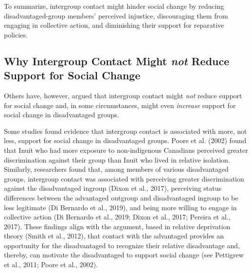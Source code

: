 \documentclass[12pt, letterpaper]{article}
\begin{document}
To summarize, intergroup contact might hinder social change by reducing
disadvantaged-group members' perceived injustice, discouraging them from
engaging in collective action, and diminishing their support for
reparative policies.

\hypertarget{why-intergroup-contact-might-not-reduce-support-for-social-change}{%
\subsection{\texorpdfstring{Why Intergroup Contact Might \emph{not}
Reduce Support for Social
Change}{Why Intergroup Contact Might not Reduce Support for Social Change}}\label{why-intergroup-contact-might-not-reduce-support-for-social-change}}

Others have, however, argued that intergroup contact might \emph{not}
reduce support for social change and, in some circumstances, might even
\emph{increase} support for social change in disadvantaged groups.

Some studies found evidence that intergroup contact is associated with
more, not less, support for social change in disadvantaged groups. Poore
et al. (2002) found that Inuit who had more exposure to non-indigenous
Canadians perceived greater discrimination against their group than
Inuit who lived in relative isolation. Similarly, researchers found
that, among members of various disadvantaged groups, intergroup contact
was associated with perceiving greater discrimination against the
disadvantaged ingroup (Dixon et al., 2017), perceiving status
differences between the advantaged outgroup and disadvantaged ingroup to
be less legitimate (Di Bernardo et al., 2019), and being more willing to
engage in collective action (Di Bernardo et al., 2019; Dixon et al.,
2017; Pereira et al., 2017). These findings align with the argument,
based in relative deprivation theory (Smith et al., 2012), that contact
with the advantaged provides an opportunity for the disadvantaged to
recognize their relative disadvantage and, thereby, can motivate the
disadvantaged to support social change (see Pettigrew et al., 2011;
Poore et al., 2002).
\end{document}
